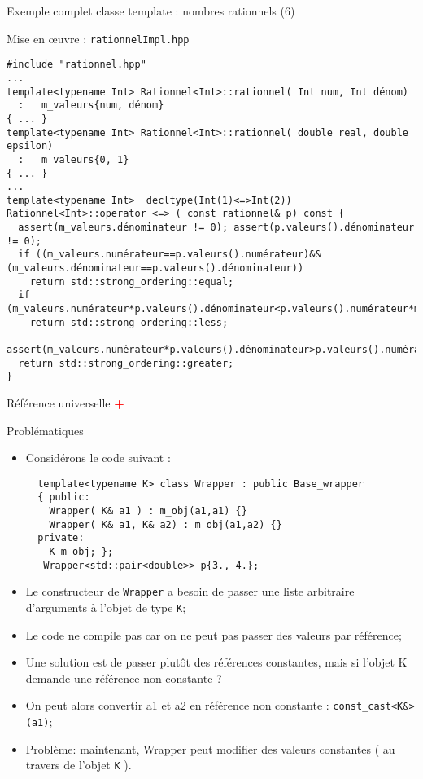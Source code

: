 \documentclass[compress,10pt,aspectratio=169]{beamer}
\begin{document}
\begin{frame}[fragile]{Exemple complet classe template : nombres rationnels (6)}
\scriptsize\vspace*{-5mm}
\begin{block}{\small Mise en {{\oe}uvre} : \texttt{rationnelImpl.hpp}}
\begin{verbatim}
#include "rationnel.hpp"
...
template<typename Int> Rationnel<Int>::rationnel( Int num, Int dénom)
  :   m_valeurs{num, dénom}
{ ... }
template<typename Int> Rationnel<Int>::rationnel( double real, double epsilon)
  :   m_valeurs{0, 1}
{ ... }
...
template<typename Int>  decltype(Int(1)<=>Int(2)) 
Rationnel<Int>::operator <=> ( const rationnel& p) const {
  assert(m_valeurs.dénominateur != 0); assert(p.valeurs().dénominateur != 0);
  if ((m_valeurs.numérateur==p.valeurs().numérateur)&&(m_valeurs.dénominateur==p.valeurs().dénominateur))
    return std::strong_ordering::equal;
  if (m_valeurs.numérateur*p.valeurs().dénominateur<p.valeurs().numérateur*m_valeurs.dénominateur)
    return std::strong_ordering::less;
  assert(m_valeurs.numérateur*p.valeurs().dénominateur>p.valeurs().numérateur*m_valeurs.dénominateur);
  return std::strong_ordering::greater;  
}  
\end{verbatim}
\end{block}
\end{frame}  

%

\begin{frame}[fragile]{Référence universelle \hspace*{9cm}\textcolor{red}{\Huge\bf +}}
  \scriptsize
  \begin{block}{\small Problématiques}
  \begin{itemize}
  \item Considérons le code suivant :
  \begin{verbatim}
  template<typename K> class Wrapper : public Base_wrapper
  { public:
    Wrapper( K& a1 ) : m_obj(a1,a1) {}
    Wrapper( K& a1, K& a2) : m_obj(a1,a2) {}
  private:
    K m_obj; };
   Wrapper<std::pair<double>> p{3., 4.};
  \end{verbatim}
    \item Le constructeur de \texttt{Wrapper} a besoin de passer une liste 
          arbitraire d'arguments à l'objet de type \texttt{K};
    \item Le code ne compile pas car on ne peut pas passer des valeurs par référence;
    \item Une solution est de passer plutôt des références constantes, mais si 
          l'objet K demande une référence non constante ?
    \item On peut alors convertir a1 et a2 en référence non constante : 
          \texttt{const_cast<K&>(a1)};
    \item \alert{Problème}:  maintenant, Wrapper peut modifier des valeurs 
          constantes ( au travers de l'objet \texttt{K} ).
  \end{itemize}
  \end{block}
  \end{frame}
  
\end{document}
